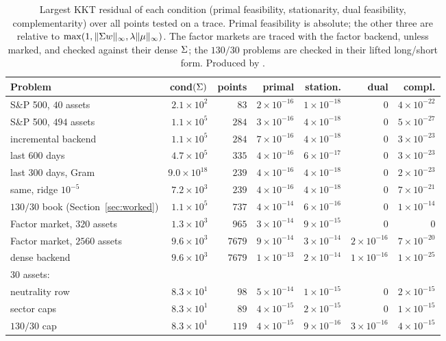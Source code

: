 \begin{table}[t]
\centering
\small
\setlength{\tabcolsep}{5pt}
\begin{tabular}{lrrrrrr}
\hline
Problem & cond$(\Sigma)$ & points & primal & station. & dual & compl. \\
\hline
S\&P 500, $40$ assets & $2.1\times10^{2}$ & $83$ & $2\times10^{-16}$ & $1\times10^{-18}$ & $0$ & $4\times10^{-22}$ \\
S\&P 500, $494$ assets & $1.1\times10^{5}$ & $284$ & $3\times10^{-16}$ & $4\times10^{-18}$ & $0$ & $5\times10^{-27}$ \\
\quad incremental backend & $1.1\times10^{5}$ & $284$ & $7\times10^{-16}$ & $4\times10^{-18}$ & $0$ & $3\times10^{-23}$ \\
\quad last $600$ days & $4.7\times10^{5}$ & $335$ & $4\times10^{-16}$ & $6\times10^{-17}$ & $0$ & $3\times10^{-23}$ \\
\quad last $300$ days, Gram & $9.0\times10^{18}$ & $239$ & $4\times10^{-16}$ & $4\times10^{-18}$ & $0$ & $2\times10^{-23}$ \\
\quad same, ridge $10^{-5}$ & $7.2\times10^{3}$ & $239$ & $4\times10^{-16}$ & $4\times10^{-18}$ & $0$ & $7\times10^{-21}$ \\
\quad $130/30$ book (Section~\ref{sec:worked}) & $1.1\times10^{5}$ & $737$ & $4\times10^{-14}$ & $6\times10^{-16}$ & $0$ & $1\times10^{-14}$ \\
Factor market, $320$ assets & $1.3\times10^{3}$ & $965$ & $3\times10^{-14}$ & $9\times10^{-15}$ & $0$ & $0$ \\
Factor market, $2560$ assets & $9.6\times10^{3}$ & $7679$ & $9\times10^{-14}$ & $3\times10^{-14}$ & $2\times10^{-16}$ & $7\times10^{-20}$ \\
\quad dense backend & $9.6\times10^{3}$ & $7679$ & $1\times10^{-13}$ & $2\times10^{-14}$ & $1\times10^{-16}$ & $1\times10^{-25}$ \\
$30$ assets: & & & & & & \\
\quad neutrality row & $8.3\times10^{1}$ & $98$ & $5\times10^{-14}$ & $1\times10^{-15}$ & $0$ & $2\times10^{-15}$ \\
\quad sector caps & $8.3\times10^{1}$ & $89$ & $4\times10^{-15}$ & $2\times10^{-15}$ & $0$ & $1\times10^{-15}$ \\
\quad $130/30$ cap & $8.3\times10^{1}$ & $119$ & $4\times10^{-15}$ & $9\times10^{-16}$ & $3\times10^{-16}$ & $4\times10^{-15}$ \\
\hline
\end{tabular}
\caption{Largest KKT residual of each condition (primal feasibility, stationarity,
dual feasibility, complementarity) over all points tested on a trace. Primal feasibility
is absolute; the other three are relative to
$\max(1, \lVert\Sigma w\rVert_\infty, \lambda\lVert\mu\rVert_\infty)$. The factor markets
are traced with the factor backend, unless marked, and checked against their dense
$\Sigma$; the $130/30$ problems are checked in their lifted long/short form. Produced by .}
\label{tab:kkt}
\end{table}

